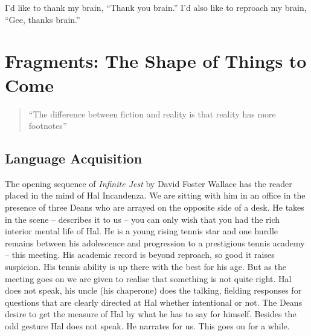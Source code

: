 \documentclass[dah,phd,a4paper]{xe_uccthesis}
\newcommand{\work}[1] {\textit{#1}}
\begin{document}
I'd like to thank my brain, “Thank you brain.” I'd also like to reproach my brain, “Gee, thanks brain.”

\newpage{}
\setcounter{chapter}{-1}
\setcounter{section}{-1}
\chapter{Fragments: The Shape of Things to Come}

\begin{quotation}
``The difference between fiction and reality is that reality has
more footnotes''
\end{quotation}

\section{Language Acquisition}

	The opening sequence of \work{Infinite Jest}\cite{wallace_infinite_1997} by David Foster Wallace has the reader placed in the mind of Hal Incandenza. We are sitting with him in an office in the presence of three Deans who are arrayed on the opposite side of a desk. He takes in the scene -- describes it to us -- you can only wish that you had the rich interior mental life of Hal. He is a young rising tennis star and one hurdle remains between his adolescence and progression to a prestigious tennis academy – this meeting. His academic record is beyond reproach, so good it raises suspicion. His tennis ability is up there with the best for his age. But as the meeting goes on we are given to realise that something is not quite right. Hal does not speak, his uncle (his chaperone) does the talking, fielding responses for questions that are clearly directed at Hal whether intentional or not. The Deans desire to get the measure of Hal by what he has to say for himself. Besides the odd gesture Hal does not speak. He narrates for us. This goes on for a while.
\end{document}
